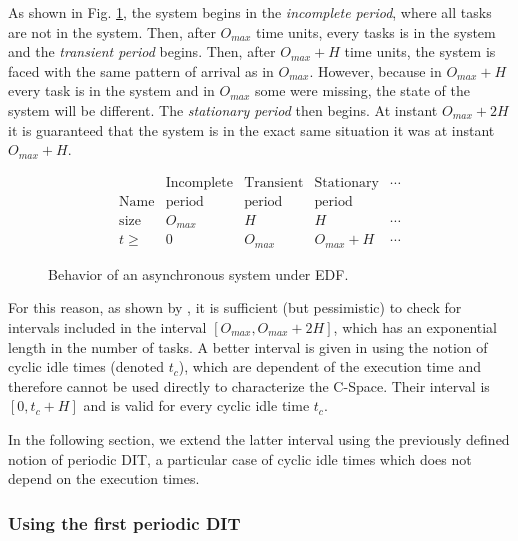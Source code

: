 \documentclass[conference]{IEEEtran}
\begin{document}
			As shown in Fig. \ref{fig:asyncBehavior}, the system begins in the
			\emph{incomplete period}, where all tasks are not in the system. Then, after
			$O_{max}$ time units, every tasks is in the system and the \emph{transient
			period} begins. Then, after $O_{max} + H$ time units, the system is faced
			with the same pattern of arrival as in $O_{max}$. However, because in
			$O_{max} + H$ every task is in the system and in $O_{max}$ some were missing,
			the state of the system will be different. The \emph{stationary period} then
			begins. At instant $O_{max} + 2H$ it is guaranteed that the system is in the
			exact same situation it was at instant $O_{max} + H$.

			\begin{figure}[h]
				\[
					\begin{array}{r||c|c|c|l}
									& \text{Incomplete} & \text{Transient}	& \text{Stationary} & \cdots \\
						\text{Name} & \text{period} 	& \text{period} 	& \text{period}  	& \\ \hline
						\text{size} & O_{max} 			& H 				& H 				& \cdots \\ \hline
						t \geqslant & 0 				& O_{max} 			& O_{max} + H 		& \cdots
					\end{array}
				\]
				\begin{center}
				\caption{Behavior of an asynchronous system under EDF.}
				\label{fig:asyncBehavior}
				\end{center}
			\end{figure}

			For this reason, as shown by \cite{leung1982complexity}, it is sufficient (but pessimistic) to
			check for
			intervals included in the interval $[O_{max}, O_{max} + 2H]$, which has an exponential length
			in the number of tasks. A better interval is given in \cite{choquet2004minimal} using the
			notion of cyclic idle times (denoted $t_c$), which are dependent of the execution
			time and therefore cannot be used directly to characterize the C-Space. Their interval is $[0, t_c + H]$ and is valid for
			every cyclic idle time $t_c$.

			In the following section, we extend the latter interval using the previously defined notion
			of periodic DIT, a particular case of cyclic idle times which does not depend on the execution
			times.

\subsubsection{Using the first periodic DIT}
\end{document}
